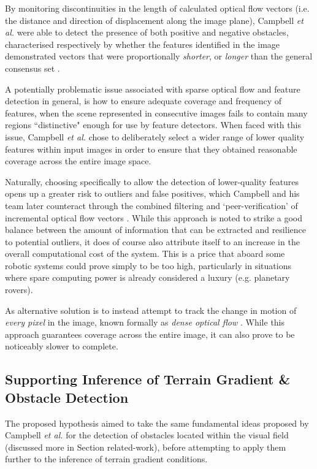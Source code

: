  By monitoring discontinuities in the length of calculated optical flow vectors (i.e. the distance and direction of displacement along the image plane), Campbell \textit{et al.} were able to detect the presence of both positive and negative obstacles, characterised respectively by whether the features identified in the image demonstrated vectors that were proportionally \textit{shorter}, or \textit{longer} than the general consensus set \cite{campbell}.

A potentially problematic issue associated with sparse optical flow and feature detection in general, is how to ensure adequate coverage and frequency of features, when the scene represented in consecutive images fails to contain many regions ``distinctive" enough for use by feature detectors. When faced with this issue, Campbell \textit{et al.} \cite{campbell} chose to deliberately select a wider range of lower quality features within input images in order to ensure that they obtained reasonable coverage across the entire image space. 

Naturally, choosing specifically to allow the detection of lower-quality features opens up a greater risk to outliers and false positives, which Campbell and his team later counteract through the combined filtering and `peer-verification' of incremental optical flow vectors \cite{campbell}. While this approach is noted to strike a good balance between the amount of information that can be extracted and resilience to potential outliers, it does of course also attribute itself to an increase in the overall computational cost of the system. This is a price that aboard some robotic systems could prove simply to be too high, particularly in situations where spare computing power is already considered a luxury (e.g. planetary rovers). 

As alternative solution is to instead attempt to track the change in motion of \textit{every pixel} in the image, known formally as \textit{dense optical flow} \cite{nourani}. While this approach guarantees coverage across the entire image, it can also prove to be noticeably slower to complete.

\subsection{Supporting Inference of Terrain Gradient \& Obstacle Detection}
\label{hypo-gradient}

The proposed hypothesis aimed to take the same fundamental ideas proposed by Campbell \textit{et al.} \cite{campbell} for the detection of obstacles located within the visual field (discussed more in Section 
{related-work}), before attempting to apply them further to the inference of terrain gradient conditions. 

